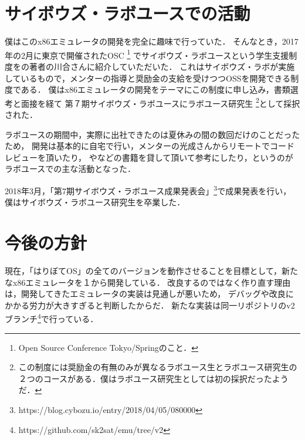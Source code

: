\documentclass[10pt,a4j]{jsarticle}
\begin{document}


\section{サイボウズ・ラボユースでの活動}

僕はこのx86エミュレータの開発を完全に趣味で行っていた．
そんなとき，2017年の2月に東京で開催されたOSC
\footnote{Open Source Conference Tokyo/Springのこと．}
でサイボウズ・ラボユースという学生支援制度を\cite{30days-osdev}の著者の川合さんに紹介していただいた．
これはサイボウズ・ラボが実施しているもので，メンターの指導と奨励金の支給を受けつつOSSを開発できる制度である．
僕はx86エミュレータの開発をテーマにこの制度に申し込み，書類選考と面接を経て
第７期サイボウズ・ラボユースにラボユース研究生
\footnote{この制度には奨励金の有無のみが異なるラボユース生とラボユース研究生の２つのコースがある．僕はラボユース研究生としては初の採択だったようだ．}として採択された．

ラボユースの期間中，実際に出社できたのは夏休みの間の数回だけのことだったため，
開発は基本的に自宅で行い，メンターの光成さんからリモートでコードレビューを頂いたり，
\cite{read-486}や\cite{effective-cpp}などの書籍を貸して頂いて参考にしたり，というのがラボユースでの主な活動となった．


2018年3月，「第7期サイボウズ・ラボユース成果発表会」\footnote{https://blog.cybozu.io/entry/2018/04/05/080000}で成果発表を行い，
僕はサイボウズ・ラボユース研究生を卒業した．

\section{今後の方針}

現在，「はりぼてOS」の全てのバージョンを動作させることを目標として，新たなx86エミュレータを１から開発している．
改良するのではなく作り直す理由は，開発してきたエミュレータの実装は見通しが悪いため，
デバッグや改良にかかる労力が大きすぎると判断したからだ．
新たな実装は同一リポジトリのv2ブランチ\footnote{https://github.com/sk2sat/emu/tree/v2}で行っている．
\end{document}
